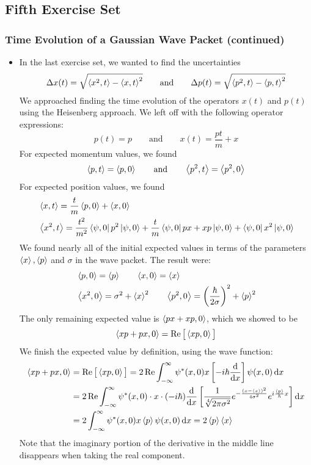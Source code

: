 \documentclass[11pt, a4paper]{article}
\newcommand{\diff}{\mathop{}\!\mathrm{d}} %
\newcommand{\eqtext}[1]{\qquad \text{#1} \qquad}
\begin{document}
\subsection{Fifth Exercise Set}

\subsubsection{Time Evolution of a Gaussian Wave Packet (continued)}
\begin{itemize}
	\item In the last exercise set, we wanted to find the uncertainties
	\begin{equation*}
		\Delta x(t) = \sqrt{\ev{x^{2}, t} - \ev{x, t}^{2}} \eqtext{and} \Delta p(t) = \sqrt{\ev{p^{2}, t} - \ev{p, t}^{2}}
	\end{equation*}
	We approached finding the time evolution of the operators $ x(t) $ and $ p(t) $ using the Heisenberg approach. We left off with the following operator expressions:
	\begin{equation*}
		p(t) = p \eqtext{and} x(t) = \frac{pt}{m} + x
	\end{equation*}
	For expected momentum values, we found
	\begin{equation*}
		\ev{p, t} = \ev{p, 0} \eqtext{and} \ev{p^{2}, t} = \ev{p^{2}, 0}
	\end{equation*}
	For expected position values, we found
	\begin{align*}
		&\ev{x, t} = \frac{t}{m} \ev{p, 0} + \ev{x, 0}\\
		&\ev{x^{2}, t} = \frac{t^{2}}{m^{2}}\bra{\psi, 0} p^{2} \ket{\psi, 0} + \frac{t}{m}\bra{\psi, 0} px + xp \ket{\psi, 0} + \bra{\psi, 0} x^{2} \ket{\psi, 0}
	\end{align*}
	We found nearly all of the initial expected values in terms of the parameters $ \ev{x}, \ev{p} $ and $ \sigma $ in the wave packet. The result were:
	\begin{align*}
		&\ev{p, 0} = \ev{p} \qquad \ev{x, 0} = \ev{x}\\
		&\ev{x^{2}, 0} = \sigma^{2} + \ev{x}^{2} \qquad \ev{p^{2}, 0} = \left(\frac{\hbar}{2\sigma}\right)^{2} + \ev{p}^{2}
	\end{align*}
	The only remaining expected value is $ \ev{px + xp, 0} $, which we showed to be
	\begin{equation*}
		\ev{xp + px, 0} = \Re \big[\ev{xp, 0}\big]
	\end{equation*}
	We finish the expected value by definition, using the wave function:
	\begin{align*}
		\ev{xp + px, 0} &= \Re \big[\ev{xp, 0}\big] = 2\Re \int_{-\infty}^{\infty}\psi^{*}(x, 0)x\left[-i\hbar \dv{x}\right]\psi(x, 0) \diff x\\
		&= 2 \Re \int_{-\infty}^{\infty} \psi^{*}(x, 0) \cdot x \cdot (-i\hbar)\dv{x}\left[\frac{1}{\sqrt[4]{2\pi \sigma^{2}}}e^{-\frac{(x - \ev{x})^{2}}{4\sigma^{2}}}e^{i\frac{\ev{p}}{\hbar}x}\right]  \diff x\\
		&=2 \int_{-\infty}^{\infty} \psi^{*}(x, 0)x \ev{p} \psi(x, 0) \diff x = 2 \ev{p}\ev{x}
	\end{align*}
	Note that the imaginary portion of the derivative in the middle line disappears when taking the real component.
	

\end{itemize}
\end{document}
